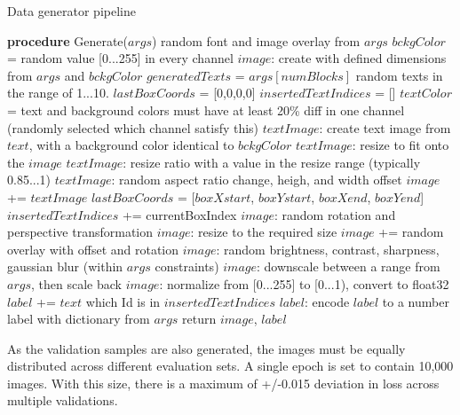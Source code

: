 \begin{algorithm}
  \caption{Data generator pipeline}
\begin{algorithmic}[1]
\label{alg:alg}
 \STATE \textbf{procedure} Generate($args$)
 \STATE random font and image overlay from $args$
 \STATE $bckgColor$ = random value [0...255] in every channel
 \STATE $image$: create with defined dimensions from $args$ and $bckgColor$
 \STATE $generatedTexts$ = $args[numBlocks]$ random texts in the range of 1...10.
 \STATE $lastBoxCoords$ = [0,0,0,0]
 \STATE $insertedTextIndices$ = []
 \STATE $textColor$ = text and background colors must have at least 20\% diff in one channel (randomly selected which channel satisfy this)
 \STATE $textImage$: create text image from $text$, with a background color identical to $bckgColor$
 \STATE $textImage$: resize to fit onto the $image$
 \ENDIF
 \STATE $textImage$: resize ratio with a value in the resize range (typically 0.85...1)
 \STATE $textImage$: random aspect ratio change, heigh, and width offset
 \STATE $image$ += $textImage$
 \STATE $lastBoxCoords$ = [$boxXstart$, $boxYstart$, $boxXend$, $boxYend$]
 \STATE $insertedTextIndices$ += currentBoxIndex
 \ENDIF
 \ENDFOR
 \STATE $image$: random rotation and perspective transformation
 \STATE $image$: resize to the required size
 \STATE $image$ += random overlay with offset and rotation
 \STATE $image$: random brightness, contrast, sharpness, gaussian blur (within $args$ constraints)
 \STATE $image$: downscale between a range from $args$, then scale back
 \STATE $image$: normalize from [0...255] to [0...1), convert to float32
 \STATE $label$ += $text$ which Id is in $insertedTextIndices$
 \STATE $label$: encode $label$ to a number label with dictionary from $args$
 \STATE return $image$, $label$
 
\end{algorithmic}
\end{algorithm}

As the validation samples are also generated, the images must be equally distributed across different evaluation sets. A single epoch is set to contain 10,000 images. With this size, there is a maximum of +/-0.015 deviation in loss across multiple validations.

